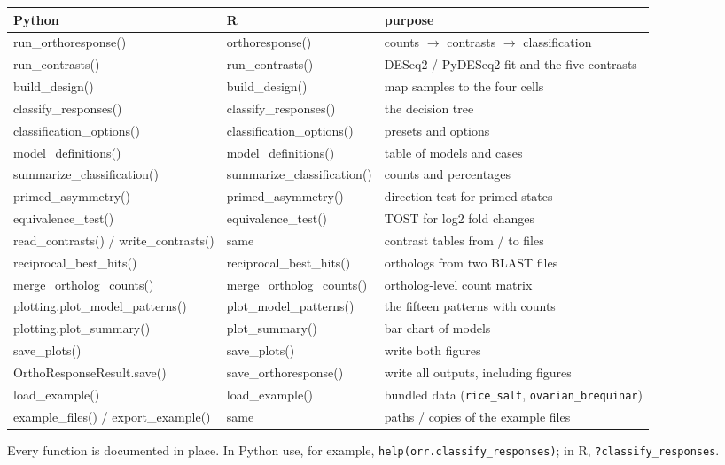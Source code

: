 \documentclass[11pt,a4paper]{article}
\newcommand{\code}[1]{\texttt{\color{navy!85!black}#1}}
\begin{document}
\begin{center}
\small
\begin{tabularx}{\linewidth}{>{\ttfamily\color{grpA!85!black}}l >{\ttfamily\color{grpB!85!black}}l Y}
\toprule
\textsf{\textbf{Python}} & \textsf{\textbf{R}} & \textsf{\textbf{purpose}}\\
\midrule
run\_orthoresponse() & orthoresponse() & counts \(\rightarrow\) contrasts \(\rightarrow\) classification\\
run\_contrasts() & run\_contrasts() & DESeq2 / PyDESeq2 fit and the five contrasts\\
build\_design() & build\_design() & map samples to the four cells\\
classify\_responses() & classify\_responses() & the decision tree\\
classification\_options() & classification\_options() & presets and options\\
model\_definitions() & model\_definitions() & table of models and cases\\
summarize\_classification() & summarize\_classification() & counts and percentages\\
primed\_asymmetry() & primed\_asymmetry() & direction test for primed states\\
equivalence\_test() & equivalence\_test() & TOST for log2 fold changes\\
read\_contrasts() / write\_contrasts() & {\color{grpB!85!black}same} & contrast tables from / to files\\
reciprocal\_best\_hits() & reciprocal\_best\_hits() & orthologs from two BLAST files\\
merge\_ortholog\_counts() & merge\_ortholog\_counts() & ortholog-level count matrix\\
plotting.plot\_model\_patterns() & plot\_model\_patterns() & the fifteen patterns with counts\\
plotting.plot\_summary() & plot\_summary() & bar chart of models\\
save\_plots() & save\_plots() & write both figures\\
OrthoResponseResult.save() & save\_orthoresponse() & write all outputs, including figures\\
load\_example() & load\_example() & bundled data (\code{rice\_salt}, \code{ovarian\_brequinar})\\
example\_files() / export\_example() & {\color{grpB!85!black}same} & paths / copies of the example files\\
\bottomrule
\end{tabularx}
\end{center}
Every function is documented in place. In Python use, for example,
\code{help(orr.classify\_responses)}; in R, \code{?classify\_responses}.
\end{document}
